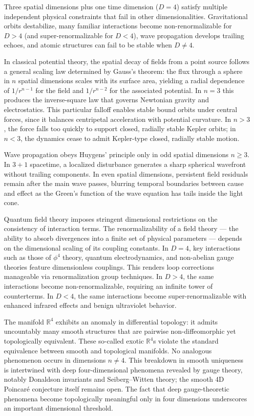 Three spatial dimensions plus one time dimension ($D=4$) satisfy multiple independent physical constraints that fail in other dimensionalities. Gravitational orbits destabilize, many familiar interactions become non-renormalizable for $D>4$ (and super-renormalizable for $D<4$), wave propagation develops trailing echoes, and atomic structures can fail to be stable when $D \ne 4$.

In classical potential theory, the spatial decay of fields from a point source follows a general scaling law determined by Gauss’s theorem: the flux through a sphere in $n$ spatial dimensions scales with its surface area, yielding a radial dependence of $1/r^{n-1}$ for the field and $1/r^{n-2}$ for the associated potential. In $n=3$ this produces the inverse-square law that governs Newtonian gravity and electrostatics. This particular falloff enables stable bound orbits under central forces, since it balances centripetal acceleration with potential curvature. In $n>3$, the force falls too quickly to support closed, radially stable Kepler orbits; in $n<3$, the dynamics cease to admit Kepler-type closed, radially stable motion.

Wave propagation obeys Huygens' principle only in odd spatial dimensions $n\ge 3$. In $3+1$ spacetime, a localized disturbance generates a sharp spherical wavefront without trailing components. In even spatial dimensions, persistent field residuals remain after the main wave passes, blurring temporal boundaries between cause and effect as the Green’s function of the wave equation has tails inside the light cone.

Quantum field theory imposes stringent dimensional restrictions on the consistency of interaction terms. The renormalizability of a field theory — the ability to absorb divergences into a finite set of physical parameters — depends on the dimensional scaling of its coupling constants. In $D=4$, key interactions such as those of $\phi^4$ theory, quantum electrodynamics, and non-abelian gauge theories feature dimensionless couplings. This renders loop corrections manageable via renormalization group techniques. In $D>4$, the same interactions become non-renormalizable, requiring an infinite tower of counterterms. In $D<4$, the same interactions become super-renormalizable with enhanced infrared effects and benign ultraviolet behavior.

The manifold $\mathbb{R}^4$ exhibits an anomaly in differential topology: it admits uncountably many smooth structures that are pairwise non-diffeomorphic yet topologically equivalent. These so-called exotic $\mathbb{R}^4$s violate the standard equivalence between smooth and topological manifolds. No analogous phenomenon occurs in dimensions $n \ne 4$. This breakdown in smooth uniqueness is intertwined with deep four-dimensional phenomena revealed by gauge theory, notably Donaldson invariants and Seiberg–Witten theory; the smooth 4D Poincaré conjecture itself remains open. The fact that deep gauge-theoretic phenomena become topologically meaningful only in four dimensions underscores an important dimensional threshold.

